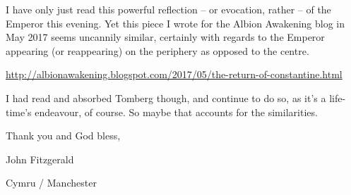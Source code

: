 \begin{footnotesize}
\begin{sffamily}
I have only just read this powerful reflection -- or evocation, rather -- of the Emperor this evening. Yet this piece I wrote for the Albion Awakening blog in May 2017 seems uncannily similar, certainly with regards to the Emperor appearing (or reappearing) on the periphery as opposed to the centre.

\url{http://albionawakening.blogspot.com/2017/05/the-return-of-constantine.html}


I had read and absorbed Tomberg though, and continue to do so, as it's a life-time's endeavour, of course. So maybe that accounts for the similarities.

Thank you and God bless,

John Fitzgerald

Cymru / Manchester

\end{sffamily}
\end{footnotesize}

